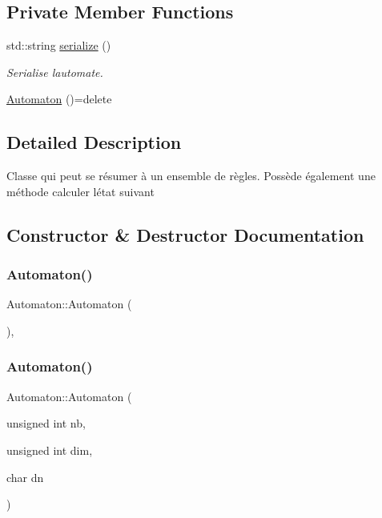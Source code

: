 \subsection*{Private Member Functions}
\begin{DoxyCompactItemize}
\item 
std\+::string \mbox{\hyperlink{class_automaton_a1f1af7879a469e3ad8c282d0a58a7da4}{serialize}} ()
\begin{DoxyCompactList}\small\item\em Serialise l\textquotesingle{}automate. \end{DoxyCompactList}\item 
\mbox{\hyperlink{class_automaton_a6400f21ac67170631963cbc29638ec8c}{Automaton}} ()=delete
\end{DoxyCompactItemize}


\subsection{Detailed Description}
Classe qui peut se résumer à un ensemble de règles. Possède également une méthode calculer l\textquotesingle{}état suivant 

\subsection{Constructor \& Destructor Documentation}
\mbox{\label{class_automaton_a6400f21ac67170631963cbc29638ec8c}} 
\subsubsection{\texorpdfstring{Automaton()}{Automaton()}\hspace{0.1cm}{\footnotesize\ttfamily [1/5]}}
{\footnotesize\ttfamily Automaton\+::\+Automaton (\begin{DoxyParamCaption}{ }\end{DoxyParamCaption})\hspace{0.3cm}{\ttfamily [private]}, {\ttfamily [delete]}}

\mbox{\label{class_automaton_a6dee06d8b80717d8ac77e284871bb972}} 
\subsubsection{\texorpdfstring{Automaton()}{Automaton()}\hspace{0.1cm}{\footnotesize\ttfamily [2/5]}}
{\footnotesize\ttfamily Automaton\+::\+Automaton (\begin{DoxyParamCaption}\item[{unsigned int}]{nb,  }\item[{unsigned int}]{dim,  }\item[{char}]{dn }\end{DoxyParamCaption})\hspace{0.3cm}{\ttfamily [inline]}}



